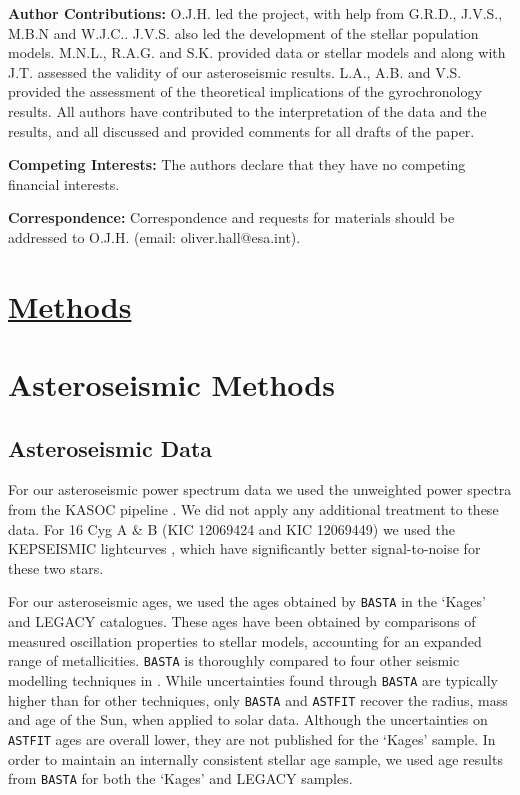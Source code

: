 \documentclass[12pt]{article}
\begin{document}
\textbf{Author Contributions:} O.J.H. led the project, with help from G.R.D., J.V.S., M.B.N and W.J.C.. J.V.S. also led the development of the stellar population models. M.N.L., R.A.G. and S.K. provided data or stellar models and along with J.T. assessed the validity of our asteroseismic results. L.A., A.B. and V.S. provided the assessment of the theoretical implications of the gyrochronology results. All authors have contributed to the interpretation of the data and the results, and all discussed and provided comments for all drafts of the paper.

\textbf{Competing Interests:} The authors declare that they have no competing financial interests.

\textbf{Correspondence:} Correspondence and requests for materials should be addressed to O.J.H. (email: oliver.hall@esa.int).\\

\clearpage
\section*{\underline{Methods}}
\section{Asteroseismic Methods}
\subsection{Asteroseismic Data}
For our asteroseismic power spectrum data we used the unweighted power spectra from the KASOC pipeline \cite{handberg+lund2014}. We did not apply any additional treatment to these data. For 16 Cyg A \& B (KIC 12069424 and KIC 12069449) we used the KEPSEISMIC lightcurves \cite{garcia+2011}, which have significantly better signal-to-noise for these two stars.

For our asteroseismic ages, we used the ages obtained by \texttt{BASTA} \cite[BAyesian STellar Algorithm]{silvaaguirre+2015} in the `Kages' and LEGACY catalogues. These ages have been obtained by comparisons of measured oscillation properties to stellar models, accounting for an expanded range of metallicities. \texttt{BASTA} is thoroughly compared to four other seismic modelling techniques in \cite{silvaaguirre+2017}. While uncertainties found through \texttt{BASTA} are typically higher than for other techniques, only \texttt{BASTA} and \texttt{ASTFIT} \cite[Aarhus STellar Evolution Code]{christensen-dalsgaard2008} recover the radius, mass and age of the Sun, when applied to solar data. Although the uncertainties on \texttt{ASTFIT} ages are overall lower, they are not published for the `Kages' sample. In order to maintain an internally consistent stellar age sample, we used age results from \texttt{BASTA} for both the `Kages' and LEGACY samples.
\end{document}
